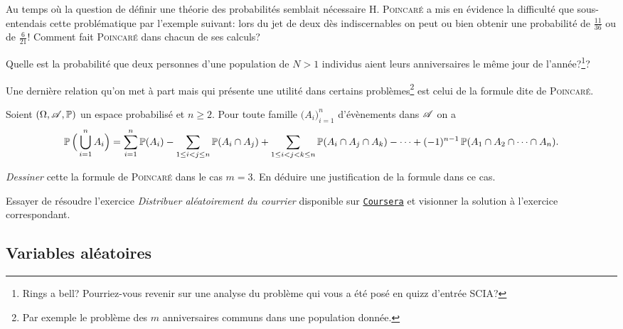 \documentclass[11pt, a4paper]{article}
\begin{document}
\begin{question}
  Au temps où la question de définir une théorie des probabilités
  semblait nécessaire \textsc{H. Poincaré} a mis en évidence la
  difficulté que sous-entendais cette problématique par l'exemple
  suivant: lors du jet de deux dès indiscernables on peut ou bien
  obtenir une probabilité de $\frac{11}{36}$ ou de $\frac{6}{21}$!
  Comment fait \textsc{Poincaré} dans chacun de ses calculs?
\end{question}
\begin{question}
  Quelle est la probabilité que deux personnes d'une population de
  $N > 1$ individus aient leurs anniversaires le même jour de
  l'année?\footnote{Rings a bell? Pourriez-vous revenir sur une
    analyse du problème qui vous a été posé en quizz d'entrée SCIA?}?
\end{question}
Une dernière relation qu'on met à part mais qui présente une utilité
dans certains problèmes\footnote{Par exemple le problème des $m$
  anniversaires communs dans une population donnée.} est celui de la
formule dite de \textsc{Poincaré}.
\begin{prop}
  Soient $(\Omega, \mathscr{A}, \operatorname{\mathbb{P}})$ un espace probabilisé et $n \geq
  2$. Pour toute famille $\big(A_i\big)_{i = 1}^n$ d'évènements dans
  $\mathscr{A}$ on a
  \[
    \operatorname{\mathbb{P}}\Big(\bigcup_{i=1}^n A_i\Big) = \sum_{i=1}^n \operatorname{\mathbb{P}}(A_i) -
    \sum_{1\leq i < j \leq n} \operatorname{\mathbb{P}}(A_i \cap A_j) + \sum_{1\leq i < j < k
      \leq n} \operatorname{\mathbb{P}}(A_i\cap A_j \cap A_k) - \cdots + (-1)^{n-1}\operatorname{\mathbb{P}}(A_1\cap
    A_2 \cap \cdots \cap A_n).
  \]
\end{prop}
\begin{question}
  \textit{Dessiner} cette la formule de \textsc{Poincaré} dans le cas
  $m = 3$. En déduire une justification de la formule dans ce cas.
\end{question}
\begin{question}
  Essayer de résoudre l'exercice \textit{Distribuer aléatoirement du
    courrier} disponible sur
  \href{https://www.coursera.org/learn/probabilites-1/supplement/8Shkn/distribution-aleatoire-du-courrier}{\texttt{Coursera}}
  et visionner la solution à l'exercice correspondant.
\end{question}

\subsection{Variables aléatoires}
\label{sec:va}
\end{document}
